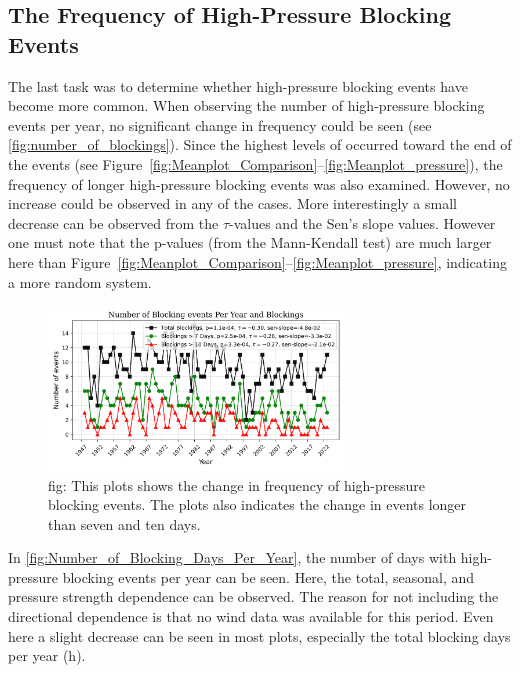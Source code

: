 \subsection{The Frequency of High-Pressure Blocking Events}
The last task was to determine whether high-pressure blocking events have become more common. When observing the number of high-pressure blocking events per year, no significant change in frequency could be seen (see \autoref{fig:number_of_blockings}). Since the highest levels of \PM  occurred toward the end of the events (see Figure~\ref{fig:Meanplot_Comparison}--\ref{fig:Meanplot_pressure}), the frequency of longer high-pressure blocking events was also examined. However, no increase could be observed in any of the cases. More interestingly a small decrease can be observed from the $\tau$-values and the Sen's slope values. However one must note that the p-values (from the Mann-Kendall test) are much larger here than Figure~\ref{fig:Meanplot_Comparison}--\ref{fig:Meanplot_pressure}, indicating a more random system. 

\begin{figure}[H]
    \centering
    \includegraphics[width=0.7\textwidth]{Figures/BlockingsPerYear.png}
    \caption{fig: This plots shows the change in frequency of high-pressure blocking events. The plots also indicates the change in events longer than seven and ten days. }
    \label{fig:number_of_blockings}
\end{figure}

In \autoref{fig:Number_of_Blocking_Days_Per_Year}, the number of days with high-pressure blocking events per year can be seen. Here, the total, seasonal, and pressure strength dependence can be observed. The reason for not including the directional dependence is that no wind data was available for this period. Even here a slight decrease can be seen in most plots, especially the total blocking days per year (h). 


